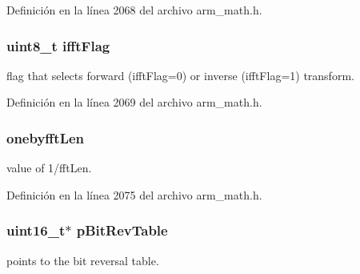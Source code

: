 Definición en la línea 2068 del archivo arm\+\_\+math.\+h.

\subsubsection[{\texorpdfstring{ifft\+Flag}{ifftFlag}}]{\setlength{\rightskip}{0pt plus 5cm}uint8\+\_\+t ifft\+Flag}\hypertarget{structarm__cfft__radix2__instance__f32_ad6ca6e223f986ebfd94c5ee1e410aa73}{}\label{structarm__cfft__radix2__instance__f32_ad6ca6e223f986ebfd94c5ee1e410aa73}
flag that selects forward (ifft\+Flag=0) or inverse (ifft\+Flag=1) transform. 

Definición en la línea 2069 del archivo arm\+\_\+math.\+h.

\subsubsection[{\texorpdfstring{onebyfft\+Len}{onebyfftLen}}]{ onebyfft\+Len}\hypertarget{structarm__cfft__radix2__instance__f32_acf295a7b97b7d48a9cae4d1ab5ed00f6}{}\label{structarm__cfft__radix2__instance__f32_acf295a7b97b7d48a9cae4d1ab5ed00f6}
value of 1/fft\+Len. 

Definición en la línea 2075 del archivo arm\+\_\+math.\+h.

\subsubsection[{\texorpdfstring{p\+Bit\+Rev\+Table}{pBitRevTable}}]{\setlength{\rightskip}{0pt plus 5cm}uint16\+\_\+t$\ast$ p\+Bit\+Rev\+Table}\hypertarget{structarm__cfft__radix2__instance__f32_a46a2fb328199897af100fea0bfdf59aa}{}\label{structarm__cfft__radix2__instance__f32_a46a2fb328199897af100fea0bfdf59aa}
points to the bit reversal table. 

